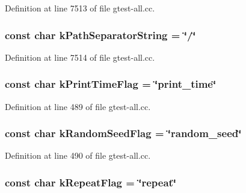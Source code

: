 \-Definition at line 7513 of file gtest-\/all.\-cc.

\hypertarget{namespacetesting_1_1internal_a4fb543ce3f3235db81a8a266cbc335cb}{
\subsubsection[{k\-Path\-Separator\-String}]{\setlength{\rightskip}{0pt plus 5cm}const char {\bf k\-Path\-Separator\-String} = \char`\"{}/\char`\"{}}}\label{d0/da7/namespacetesting_1_1internal_a4fb543ce3f3235db81a8a266cbc335cb}


\-Definition at line 7514 of file gtest-\/all.\-cc.

\hypertarget{namespacetesting_1_1internal_a75c069f656d8436272be49ad7024bb1b}{
\subsubsection[{k\-Print\-Time\-Flag}]{\setlength{\rightskip}{0pt plus 5cm}const char {\bf k\-Print\-Time\-Flag} = \char`\"{}print\-\_\-time\char`\"{}}}\label{d0/da7/namespacetesting_1_1internal_a75c069f656d8436272be49ad7024bb1b}


\-Definition at line 489 of file gtest-\/all.\-cc.

\hypertarget{namespacetesting_1_1internal_aa59cb88e76f5f3649a22dd1c32666671}{
\subsubsection[{k\-Random\-Seed\-Flag}]{\setlength{\rightskip}{0pt plus 5cm}const char {\bf k\-Random\-Seed\-Flag} = \char`\"{}random\-\_\-seed\char`\"{}}}\label{d0/da7/namespacetesting_1_1internal_aa59cb88e76f5f3649a22dd1c32666671}


\-Definition at line 490 of file gtest-\/all.\-cc.

\hypertarget{namespacetesting_1_1internal_a16c8fa0cc0f7bae57e88cfcbdf46cd57}{
\subsubsection[{k\-Repeat\-Flag}]{\setlength{\rightskip}{0pt plus 5cm}const char {\bf k\-Repeat\-Flag} = \char`\"{}repeat\char`\"{}}}\label{d0/da7/namespacetesting_1_1internal_a16c8fa0cc0f7bae57e88cfcbdf46cd57}


